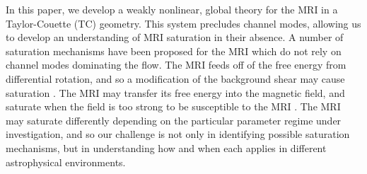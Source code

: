 \documentclass{emulateapj}
\newcommand{\citei}[1]{\citeauthor{#1} \citeyear{#1}}
\begin{document}

In this paper, we develop a weakly nonlinear, global theory for the MRI in a Taylor-Couette (TC) geometry. This system precludes channel modes, allowing us to develop an understanding of MRI saturation in their absence. A number of saturation mechanisms have been proposed for the MRI which do not rely on channel modes dominating the flow. The MRI feeds off of the free energy from differential rotation, and so a modification of the background shear may cause saturation \citep{Knobloch:2005ba, Umurhan:2007hs}. The MRI may transfer its free energy into the magnetic field, and saturate when the field is too strong to be susceptible to the MRI \citep{Ebrahimi:2009ey}. The MRI may saturate differently depending on the particular parameter regime under investigation, and so our challenge is not only in identifying possible saturation mechanisms, but in understanding how and when each applies in different astrophysical environments. 
\end{document}
